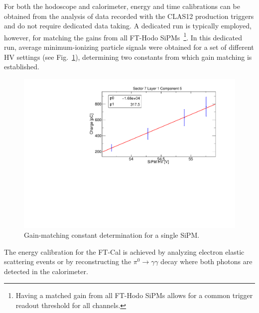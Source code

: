 For both the hodoscope and calorimeter, energy and time calibrations can be obtained from the analysis of data
recorded with the CLAS12 production triggers and do not require dedicated data taking. A dedicated run is
typically employed, however, for matching the gains from all FT-Hodo SiPMs~\footnote{Having a matched gain
from all FT-Hodo SiPMs allows for a common trigger readout threshold for all channels.}. In this dedicated run,
average minimum-ionizing particle signals were obtained for a set of different HV settings (see
Fig.~\ref{fig:fthodo_gainmatch}), determining two constants from which gain matching is established.

\begin{figure}
\includegraphics[width=1.0\columnwidth]{fig/fthodo_gainmatch.pdf}
\caption{Gain-matching constant determination for a single SiPM.}
\label{fig:fthodo_gainmatch}
\end{figure}

The energy calibration for the FT-Cal is achieved by analyzing electron elastic scattering events or by reconstructing
the $\pi^0\to\gamma\gamma$ decay where both photons are detected in the calorimeter. 

